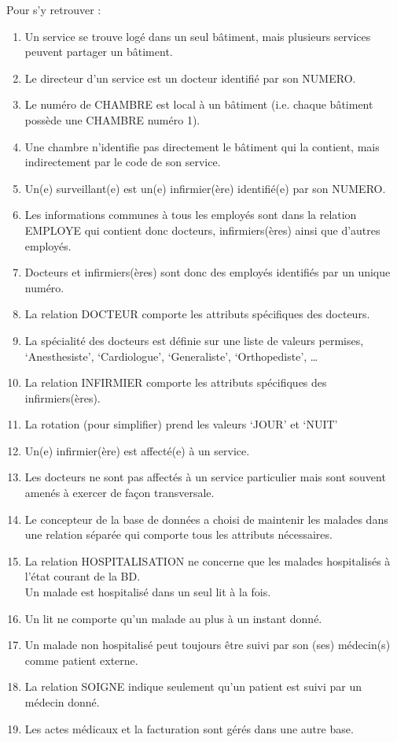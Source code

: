 \documentclass[a4paper,12pt,french]{book}
\begin{document}
Pour s'y retrouver :
\begin{enumerate}[--]
	\item Un service se trouve logé dans un seul bâtiment, mais plusieurs services peuvent partager
	un bâtiment.
	\item  Le directeur d’un service est un docteur identifié par son NUMERO.
	\item  Le numéro de CHAMBRE est local à un bâtiment (i.e. chaque bâtiment possède une
	CHAMBRE numéro 1).
	\item  Une chambre n’identifie pas directement le bâtiment qui la contient, mais indirectement
	par le code de son service.
	\item  Un(e) surveillant(e) est un(e) infirmier(ère) identifié(e) par son NUMERO.
	\item  Les informations communes à tous les employés sont dans la relation EMPLOYE qui
	contient donc docteurs, infirmiers(ères) ainsi que d’autres employés.
	\item  Docteurs et infirmiers(ères) sont donc des employés identifiés par un unique numéro.
	\item  La relation DOCTEUR comporte les attributs spécifiques des docteurs.
	\item  La spécialité des docteurs est définie sur une liste de valeurs permises, ‘Anesthesiste’,
	‘Cardiologue’, ‘Generaliste’, ‘Orthopediste’, …
	\item  La relation INFIRMIER comporte les attributs spécifiques des infirmiers(ères).
	\item  La rotation (pour simplifier) prend les valeurs ‘JOUR’ et ‘NUIT’
	\item  Un(e) infirmier(ère) est affecté(e) à un service.
	\item  Les docteurs ne sont pas affectés à un service particulier mais sont souvent amenés à
	exercer de façon transversale.
	\item  Le concepteur de la base de données a choisi de maintenir les malades dans une relation
	séparée qui comporte tous les attributs nécessaires.
	\item  La relation HOSPITALISATION ne concerne que les malades hospitalisés à l’état courant
	de la BD.\\
	Un malade est hospitalisé dans un seul lit à la fois.
	\item  Un lit ne comporte qu’un malade au plus à un instant donné.
	\item  Un malade non hospitalisé peut toujours être suivi par son (ses) médecin(s) comme patient
	externe.
	\item  La relation SOIGNE indique seulement qu’un patient est suivi par un médecin donné.
	\item  Les actes médicaux et la facturation sont gérés dans une autre base.\\
\end{enumerate}
\end{document}
